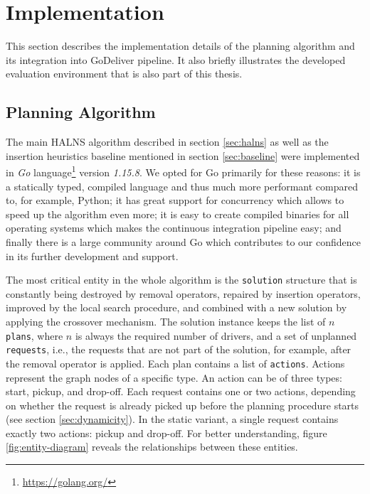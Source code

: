 \section{Implementation}
    
    This section describes the implementation details of the planning algorithm and its integration into GoDeliver pipeline. It also briefly illustrates the developed evaluation environment that is also part of this thesis.
    
    \subsection{Planning Algorithm}
    
    The main HALNS algorithm described in section \ref{sec:halns} as well as the insertion heuristics baseline mentioned in section \ref{sec:baseline} were implemented in \emph{Go} language\footnote{\url{https://golang.org/}} version \emph{1.15.8}. We opted for Go primarily for these reasons: it is a statically typed, compiled language and thus much more performant compared to, for example, Python; it has great support for concurrency which allows to speed up the algorithm even more; it is easy to create compiled binaries for all operating systems which makes the continuous integration pipeline easy; and finally there is a large community around Go which contributes to our confidence in its further development and support.
    
    The most critical entity in the whole algorithm is the \texttt{solution} structure that is constantly being destroyed by removal operators, repaired by insertion operators, improved by the local search procedure, and combined with a new solution by applying the crossover mechanism. The solution instance keeps the list of $n$ \texttt{plans}, where $n$ is always the required number of drivers, and a set of unplanned \texttt{requests}, i.e., the requests that are not part of the solution, for example, after the removal operator is applied. Each plan contains a list of \texttt{actions}. Actions represent the graph nodes of a specific type. An action can be of three types: start, pickup, and drop-off. Each request contains one or two actions, depending on whether the request is already picked up before the planning procedure starts (see section \ref{sec:dynamicity}). In the static variant, a single request contains exactly two actions: pickup and drop-off. For better understanding, figure \ref{fig:entity-diagram} reveals the relationships between these entities.
    
